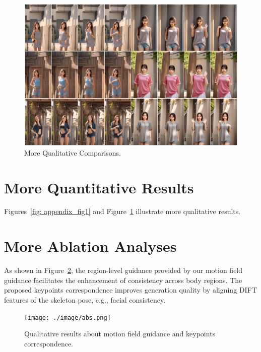 \begin{figure}[t]
    \centering
    \includegraphics[width=1.0\columnwidth]{./image/appendix_fig2.pdf}
    \vspace{-15pt}
    \caption{More Qualitative Comparisons.}
    \label{fig: appendix_fig2}
\end{figure}
 \section{More Quantitative Results}
 
 Figures~\ref{fig: appendix_fig1} and Figure~\ref{fig: appendix_fig2} illustrate more qualitative results.
\label{sec: more case}

{
\section{More Ablation Analyses}
As shown in Figure~\ref{fig: appendix abs}, the region-level guidance provided by our motion field guidance facilitates the enhancement of consistency across body regions. The proposed keypoints correspondence improves generation quality by aligning DIFT features of the skeleton pose, e.g., facial consistency.
 }

 \begin{figure}[t]
    \centering
    \texttt{[image: ./image/abs.png]}
    \caption{Qualitative results about motion field guidance and keypoints correspondence.}
    \vspace{-10pt}
    \label{fig: appendix abs}
    
\end{figure}

